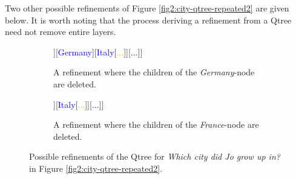 \begin{exe}
	\label{ex:subgraph}
	\label{ex:qtree-refinement}
\end{exe}


Two other possible refinements of Figure \ref{fig2:city-qtree-repeated2} are given below. It is worth noting that the process deriving a refinement from a Qtree need not remove entire layers. 



\begin{figure}[H]
	\centering
	\begin{subfigure}[t]{.45\linewidth}
		\centering
		\begin{forest}
			[{CS\\
				Jo grew up in...}[\textcolor{blue}{France}[\textcolor{orange}{Paris}][\textcolor{orange}{Lyon}][\textcolor{orange}{...}]][\textcolor{blue}{Germany}][\textcolor{blue}{Italy}[\textcolor{orange}{...}]][\textcolor{blue}{...}]]
		\end{forest}
		\caption{A refinement where the children of the \textit{Germany}-node are deleted.}\label{fig2:city-qtree-trimmed1}
	\end{subfigure}\hfill
	\begin{subfigure}[t]{.45\linewidth}
		\centering
		\begin{forest}
			[{CS\\
				Jo grew up in...}[\textcolor{blue}{France}][\textcolor{blue}{Germany} [\textcolor{orange}{Berlin}][\textcolor{orange}{...}]][\textcolor{blue}{Italy}[\textcolor{orange}{...}]][\textcolor{blue}{...}]]
		\end{forest}
		\caption{A refinement where the children of the \textit{France}-node are deleted.}\label{fig2:city-qtree-trimmed2}
	\end{subfigure}
	\caption{Possible refinements of the Qtree for \textit{Which city did Jo grow up in?} in Figure \ref{fig2:city-qtree-repeated2}.}\label{fig:qtrees-trimmed}
\end{figure}




